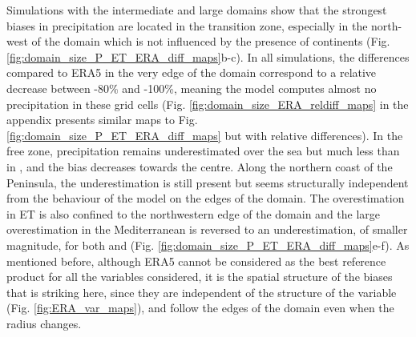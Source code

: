 Simulations with the intermediate and large domains show that the strongest biases in precipitation are located in the transition zone, especially in the north-west of the domain which is not influenced by the presence of continents (Fig. \ref{fig:domain_size_P_ET_ERA_diff_maps}b-c).
In all simulations, the differences compared to ERA5 in the very edge of the domain correspond to a relative decrease between -80\% and -100\%, meaning the model computes almost no precipitation in these grid cells (Fig. \ref{fig:domain_size_ERA_reldiff_maps} in the appendix presents similar maps to Fig. \ref{fig:domain_size_P_ET_ERA_diff_maps} but with relative differences).
In the free zone, precipitation remains underestimated over the sea but much less than in \smalld, and the bias decreases towards the centre. Along the northern coast of the Peninsula, the underestimation is still present but seems structurally independent from the behaviour of the model on the edges of the domain.
The overestimation in ET is also confined to the northwestern edge of the domain and the large overestimation in the Mediterranean is reversed to an underestimation, of smaller magnitude, for both \interd and \larged (Fig. \ref{fig:domain_size_P_ET_ERA_diff_maps}e-f).
As mentioned before, although ERA5 cannot be considered as the best reference product for all the variables considered, it is the spatial structure of the biases that is striking here, since they are independent of the structure of the variable (Fig. \ref{fig:ERA_var_maps}), and follow the edges of the domain even when the radius changes.


